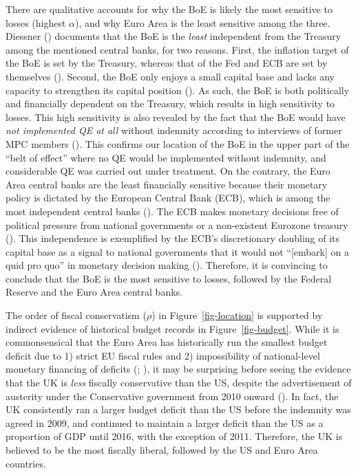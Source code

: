 \documentclass[
  a4paper,
  abstract=true]{scrartcl}
\theoremstyle{definition}
\begin{document}
There are qualitative accounts for why the BoE is likely the most
sensitive to losses (highest \(\alpha\)), and why Euro Area is the least
sensitive among the three. Diessner ()
documents that the BoE is the \emph{least} independent from the Treasury
among the mentioned central banks, for two reasons. First, the inflation
target of the BoE is set by the Treasury, whereas that of the Fed and
ECB are set by themselves ().
Second, the BoE only enjoys a small capital base and lacks any capacity
to strengthen its capital position
(). As such, the BoE is both
politically and financially dependent on the Treasury, which results in
high sensitivity to losses. This high sensitivity is also revealed by
the fact that the BoE would have \emph{not implemented QE at all}
without indemnity according to interviews of former MPC members
(). This confirms our
location of the BoE in the upper part of the ``belt of effect'' where no
QE would be implemented without indemnity, and considerable QE was
carried out under treatment. On the contrary, the Euro Area central
banks are the least financially sensitive because their monetary policy
is dictated by the European Central Bank (ECB), which is among the most
independent central banks ().
The ECB makes monetary decisions free of political pressure from
national governments or a non-existent Eurozone treasury
(). This independence is
exemplified by the ECB's discretionary doubling of its capital base as a
signal to national governments that it would not ``{[}embark{]} on a
quid pro quo'' in monetary decision making
(). Therefore, it is
convincing to conclude that the BoE is the most sensitive to losses,
followed by the Federal Reserve and the Euro Area central banks.

The order of fiscal conservatism (\(\rho\)) in Figure~\ref{fig-location}
is supported by indirect evidence of historical budget records in
Figure~\ref{fig-budget}. While it is commonsensical that the Euro Area
has historically run the smallest budget deficit due to 1) strict EU
fiscal rules and 2) impossibility of national-level monetary financing
of deficits (;
), it may be
surprising before seeing the evidence that the UK is \emph{less}
fiscally conservative than the US, despite the advertisement of
austerity under the Conservative government from 2010 onward
(). In fact, the UK
consistently ran a larger budget deficit than the US before the
indemnity was agreed in 2009, and continued to maintain a larger deficit
than the US as a proportion of GDP until 2016, with the exception of
2011. Therefore, the UK is believed to be the most fiscally liberal,
followed by the US and Euro Area countries.
\end{document}
